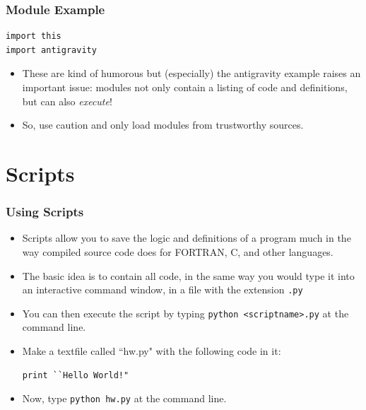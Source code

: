 \documentclass{beamer}
\begin{document}
\begin{frame}[fragile]
\frametitle{Module Example}

\begin{lstlisting}
import this
import antigravity
\end{lstlisting}
\pause
\begin{itemize}

\item These are kind of humorous but (especially) the antigravity example raises an important issue: \newline{}modules not only contain a listing of code and definitions, but can also \emph{execute}!

\item So, use caution and only load modules from trustworthy sources.
\end{itemize}

\end{frame}

\section[]{Scripts}
\begin{frame}[fragile]
\frametitle{Using Scripts}
\begin{itemize}
\item Scripts allow you to save the logic and definitions of a program much in the
 way compiled source code does for FORTRAN, C, and other languages.
\item The basic idea is to contain all code, in the same way you would type it into an interactive 
command window, in a file with the extension \texttt{.py}
\item You can then execute the script by typing \newline{} \texttt{python <scriptname>.py} \newline{}at the command line.
\pause
\item Make a textfile called ``hw.py" with the following code in it:
\begin{lstlisting}
print ``Hello World!"
\end{lstlisting}
\item Now, type \texttt{python hw.py} at the command line.
\end{itemize}
\end{frame}
\end{document}

